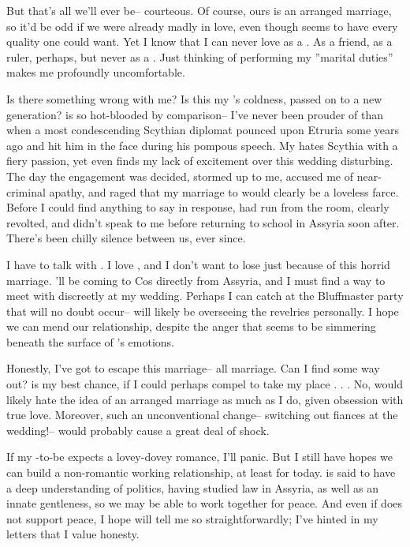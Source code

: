 \documentclass[char]{Kos}
\begin{document}
But that's all we'll ever be-- courteous. Of course, ours is an arranged marriage, so it'd be odd if we were already madly in love, even though \cBride{\they} seems to have every quality one could want. Yet I know that I can never love \cBride{\them} as a \cBride{\spouse}. As a friend, as a ruler, perhaps, but never as a \cBride{\spouse}. Just thinking of performing my ''marital duties'' makes me profoundly uncomfortable.

Is there something wrong with me? Is this my \cEtruriaKing{\parent}'s coldness, passed on to a new generation? \cPoet{} is so hot-blooded by comparison-- I've never been prouder of \cPoet{\them} than when a most condescending Scythian diplomat pounced upon Etruria some years ago and \cPoet{\they} hit him in the face during his pompous speech. My \cPoet{\sibling} hates Scythia with a fiery passion, yet even \cPoet{\they} finds my lack of excitement over this wedding disturbing. The day the engagement was decided, \cPoet{\they} stormed up to me, accused me of near-criminal apathy, and raged that my marriage to \cBride{} would clearly be a loveless farce. Before I could find anything to say in response, \cPoet{} had run from the room, clearly revolted, and \cPoet{\they} didn't speak to me before returning to school in Assyria soon after. There's been chilly silence between us, ever since.

I have to talk with \cPoet{}. I love \cPoet{\them}, and I don't want to lose \cPoet{\them} just because of this horrid marriage. \cPoet{\They}'ll be coming to Cos directly from Assyria, and I must find a way to meet with \cPoet{\them} discreetly at my wedding. Perhaps I can catch \cPoet{\them} at the Bluffmaster party that will no doubt occur-- \cPoet{} will likely be overseeing the revelries personally. I hope we can mend our relationship, despite the anger that seems to be simmering beneath the surface of \cPoet{}'s emotions.

Honestly, I've got to escape this marriage-- all marriage. Can I find some way out? \cPoet{} is my best chance, if I could perhaps compel \cPoet{} to take my place . . . No, \cPoet{\they} would likely hate the idea of an arranged marriage as much as I do, given \cPoet{\their} obsession with true love. Moreover, such an unconventional change-- switching out fiances at the wedding!-- would probably cause a great deal of shock.

 If my \cBride{\partner}-to-be expects a lovey-dovey romance, I'll panic. But I still have hopes we can build a non-romantic working relationship, at least for today. \cBride{\They} is said to have a deep understanding of politics, having studied law in Assyria, as well as an innate gentleness, so we may be able to work together for peace. And even if \cBride{\they} does not support peace, I hope \cBride{\they} will tell me so straightforwardly; I've hinted in my letters that I value honesty.
 
\end{document}
